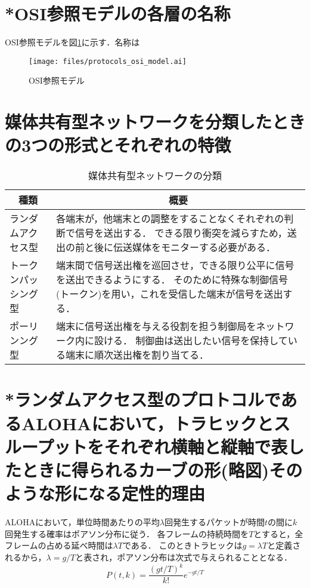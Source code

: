 \documentclass[10.5pt]{jsarticle}
\begin{document}
\section{*OSI参照モデルの各層の名称}
OSI参照モデルを図\ref{osi_refmodel}に示す．名称は
\begin{figure}[h]
	\centering
	\texttt{[image: files/protocols\_osi\_model.ai]}
	\caption{OSI参照モデル}\label{osi_refmodel}
\end{figure}



\section{媒体共有型ネットワークを分類したときの3つの形式とそれぞれの特徴}
\begin{table}[H]
	\centering
	\caption{媒体共有型ネットワークの分類} \label{media-sharing-network}
	\begin{tabularx}{0.9\hsize}{|l|X|} 
		\hline
		\multicolumn{1}{|c|}{\textbf{種類}}&\multicolumn{1}{c|}{\textbf{概要}}\\\hline\hline
		ランダムアクセス型&各端末が，他端末との調整をすることなくそれぞれの判断で信号を送出する．
							できる限り衝突を減らすため，送出の前と後に伝送媒体をモニターする必要がある．\\\hline
		トークンパッシング型&端末間で信号送出権を巡回させ，できる限り公平に信号を送出できるようにする．
							そのために特殊な制御信号(トークン)を用い，これを受信した端末が信号を送出する．\\\hline
		ポーリンング型&端末に信号送出権を与える役割を担う制御局をネットワーク内に設ける．
							制御曲は送出したい信号を保持している端末に順次送出権を割り当てる．\\\hline
	\end{tabularx}
\end{table}


\section{*ランダムアクセス型のプロトコルであるALOHAにおいて，トラヒックとスループットをそれぞれ横軸と縦軸で表したときに得られるカーブの形(略図)そのような形になる定性的理由}
ALOHAにおいて，単位時間あたりの平均$\lambda$回発生するパケットが時間$t$の間に$k$回発生する確率はポアソン分布に従う．
各フレームの持続時間を$T$とすると，全フレームの占める延べ時間は$\lambda T$である．
このときトラヒックは$g=\lambda T$と定義されるから，$\lambda = g/T$と表され，ポアソン分布は次式で与えられることとなる．
\[P(t, k) = \frac{(gt/T)^k}{k!}e^{-gt/T}\]
\end{document}
